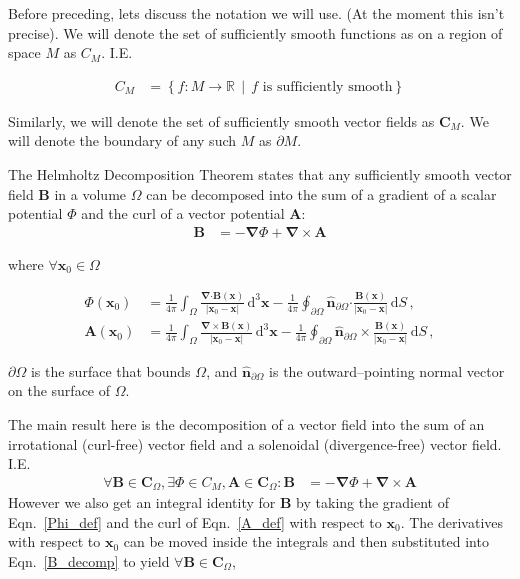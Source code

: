 \documentclass{article}
\newcommand\B{\mathbf{B}}
\newcommand\x{\mathbf{x}}
\newcommand\sm[1]{C_{#1}}
\newcommand\vsm[1]{\mathbf{C}_{#1}}
\begin{document}
Before preceding, lets discuss the notation we will use.
(At the moment this isn't precise).
We will denote the set of sufficiently smooth functions as on a region of space $M$ as $\sm{M}$. I.E.

\begin{align}
  \sm{M} &= \left\{ f:M \to \mathbb{R} \, \middle| \, f \text{ is sufficiently smooth} \right\} \nonumber
\end{align}

Similarly, we will denote the set of sufficiently smooth vector fields as $\vsm{M}$.
We will denote the boundary of any such $M$ as $\partial M$.

The Helmholtz Decomposition Theorem \citep{arfken2005mathematical} states that any sufficiently smooth vector field $\mathbf{B}$ in a volume $\Omega$ can be decomposed into the sum of a gradient of a scalar potential $\Phi$ and the curl of a vector potential $\mathbf{A}$: 
\begin{align}
\mathbf{B}&=-\boldsymbol{\nabla}\Phi+\boldsymbol{\nabla}\times\mathbf{A} \label{B_decomp}
\end{align}

where $\forall \x_0 \in \Omega$

\begin{align}
\Phi(\mathbf{x}_0) & =\frac 1 {4\pi} \int_{\Omega} \frac{\boldsymbol{\nabla}\boldsymbol{\cdot}\mathbf{B} (\mathbf{x})}{|\mathbf{x}_0 -\mathbf{x}|} \, \mathrm{d}^3\mathbf{x} -\frac 1 {4\pi} \oint_{\partial \Omega} \mathbf{\hat{n}}_{\partial \Omega} \boldsymbol{\cdot} \frac{\mathbf{B} (\mathbf{x})}{|\mathbf{x}_0-\mathbf{x}|} \, \mathrm{d}S\,, \label{Phi_def} \\[8pt]
\mathbf{A}(\mathbf{x}_0) & =\frac 1 {4\pi} \int_{\Omega} \frac{\boldsymbol{\nabla} \times \mathbf{B}(\mathbf{x})}{|\mathbf{x}_0-\mathbf{x}|} \, \mathrm{d}^3\mathbf{x} -\frac 1 {4\pi} \oint_{\partial \Omega} \mathbf{\hat{n}}_{\partial \Omega}\times\frac{\mathbf{B} (\mathbf{x})}{|\mathbf{x}_0-\mathbf{x}|} \, \mathrm{d}S\,, \label{A_def}
\end{align}

$\partial \Omega$ is the surface that bounds $\Omega$,
and $\mathbf{\hat{n}}_{\partial \Omega}$ is the outward--pointing normal vector on the surface of $\Omega$.

The main result here is the decomposition of a vector field into the sum of an irrotational (curl-free) vector field and a solenoidal (divergence-free) vector field. I.E.
\begin{align}
  \forall \B \in \vsm{\Omega}, \exists \Phi \in \sm{M}, \mathbf{A} \in \vsm{\Omega} :
    \B&=-\boldsymbol{\nabla}\Phi+\boldsymbol{\nabla}\times\mathbf{A} \nonumber
\end{align}
However we also get an integral identity for $\B$ by taking the gradient of Eqn.~\ref{Phi_def} and the curl of Eqn.~\ref{A_def} with respect to $\x_0$.
The derivatives with respect to $\x_0$ can be moved inside the integrals and then substituted into Eqn.~\ref{B_decomp} to yield $\forall \B \in \vsm{\Omega}$,
\end{document}
